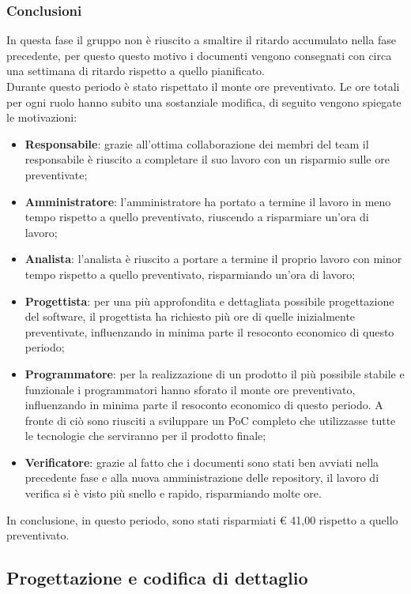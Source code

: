 \documentclass[../piano_di_progetto.tex]{subfiles}
\begin{document}
\subsubsection{Conclusioni}%
\label{sub:cons_con_3}
In questa fase il gruppo non è riuscito a smaltire il ritardo accumulato nella fase precedente, per questo questo motivo i documenti vengono consegnati con circa una settimana di ritardo rispetto a quello pianificato. \\
Durante questo periodo è stato rispettato il monte ore preventivato. Le ore totali per ogni ruolo hanno subito una sostanziale modifica, di seguito vengono spiegate le motivazioni:
\begin{itemize}
	\item \textbf{Responsabile}: grazie all'ottima collaborazione dei membri del team il responsabile è riuscito a completare il suo lavoro con un risparmio sulle ore preventivate;
	\item \textbf{Amministratore}: l'amministratore ha portato a termine il lavoro in meno tempo rispetto a quello preventivato, riuscendo a risparmiare un'ora di lavoro;
	\item \textbf{Analista}: l'analista è riuscito a portare a termine il proprio lavoro con minor tempo rispetto a quello preventivato, risparmiando un'ora di lavoro;
	\item \textbf{Progettista}: per una più approfondita e dettagliata possibile progettazione del software, il progettista ha richiesto più ore di quelle inizialmente preventivate, influenzando in minima parte il resoconto economico di questo periodo;
	\item \textbf{Programmatore}: per la realizzazione di un prodotto il più possibile stabile e funzionale i programmatori hanno sforato il monte ore preventivato, influenzando in minima parte il resoconto economico di questo periodo. A fronte di ciò sono riusciti a sviluppare un PoC completo che utilizzasse tutte le tecnologie che serviranno per il prodotto finale;
	\item \textbf{Verificatore}: grazie al fatto che i documenti sono stati ben avviati nella precedente fase e alla nuova amministrazione delle repository, il lavoro di verifica si è visto più snello e rapido, risparmiando molte ore.
\end{itemize} 
In conclusione, in questo periodo, sono stati risparmiati € 41,00 rispetto a quello preventivato.


\clearpage
\subsection{Progettazione e codifica di dettaglio}%
\label{sub:cons_prog_dettaglio}
\end{document}
